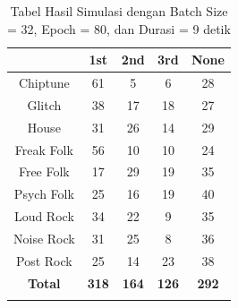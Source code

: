 \begin{longtable}[c]{|c|c|c|c|c|}
	\hline
	\textbf{}      & \textbf{1st} & \textbf{2nd} & \textbf{3rd} & \textbf{None} \\ \hline
	\endfirsthead
	\endhead
	Chiptune       & 61           & 5            & 6            & 28            \\ \hline
	Glitch         & 38           & 17           & 18           & 27            \\ \hline
	House          & 31           & 26           & 14           & 29            \\ \hline
	Freak Folk     & 56           & 10           & 10           & 24            \\ \hline
	Free Folk      & 17           & 29           & 19           & 35            \\ \hline
	Psych Folk     & 25           & 16           & 19           & 40            \\ \hline
	Loud Rock      & 34           & 22           & 9            & 35            \\ \hline
	Noise Rock     & 31           & 25           & 8            & 36            \\ \hline
	Post Rock      & 25           & 14           & 23           & 38            \\ \hline
	\textbf{Total} & \textbf{318} & \textbf{164} & \textbf{126} & \textbf{292}  \\ \hline
	\caption{Tabel Hasil Simulasi dengan Batch Size = 32, Epoch = 80, dan Durasi = 9 detik}
	\label{tab:my-table}\\
\end{longtable}

